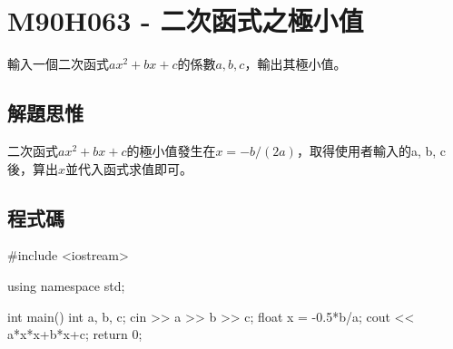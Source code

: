 \section{M90H063 - 二次函式之極小值}
輸入一個二次函式$ax^2+bx+c$的係數$a, b, c$，輸出其極小值。
\subsection{解題思惟}
二次函式$ax^2+bx+c$的極小值發生在$x=-b/(2a)$，取得使用者輸入的a, b, c後，算出$x$並代入函式求值即可。

\subsection{程式碼}
\begin{cppcode}
#include <iostream>

using namespace std;

int main()
{
	int a, b, c;
	cin >> a >> b >> c;
	float x = -0.5*b/a;
	cout << a*x*x+b*x+c;
	return 0;
}
\end{cppcode}
